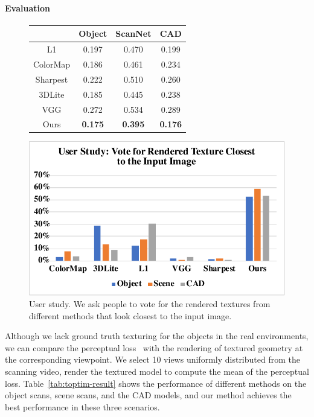 \paragraph*{Evaluation}
\begin{figure}
\begin{minipage}{0.49\linewidth}
    \centering
    \begin{tabular}{|c|c|c|c|}
        \hline
        & Object & ScanNet & CAD\\
        \hline
        L1 & 0.197 & 0.470 & 0.199 \\
        \hline
        ColorMap & 0.186 & 0.461 & 0.234 \\
        \hline
        Sharpest & 0.222 & 0.510 & 0.260 \\
        \hline
        3DLite & 0.185 & 0.445 & 0.238 \\
        \hline
        VGG & 0.272 & 0.534 & 0.289 \\
        \hline
        Ours & \textbf{0.175} & \textbf{0.395} & \textbf{0.176} \\
        \hline
    \end{tabular}
    \label{tab:toptim-result}
\end{minipage}
\begin{minipage}{0.49\linewidth}
    \centering
    \includegraphics[width=0.8\linewidth]{texturegen/figures/user.pdf}
    \caption{User study. We ask people to vote for the rendered textures from different methods that look closest to the input image.}
    \label{fig:user-study}
\end{minipage}
\end{figure}
Although we lack ground truth texturing for the objects in the real environments, we can compare the perceptual loss~\cite{zhang2018unreasonable} with the rendering of textured geometry at the corresponding viewpoint. We select 10 views uniformly distributed from the scanning video, render the textured model to compute the mean of the perceptual loss.
Table~\ref{tab:toptim-result} shows the performance of different methods on the object scans, scene scans, and the CAD models, and our method achieves the best performance in these three scenarios.


